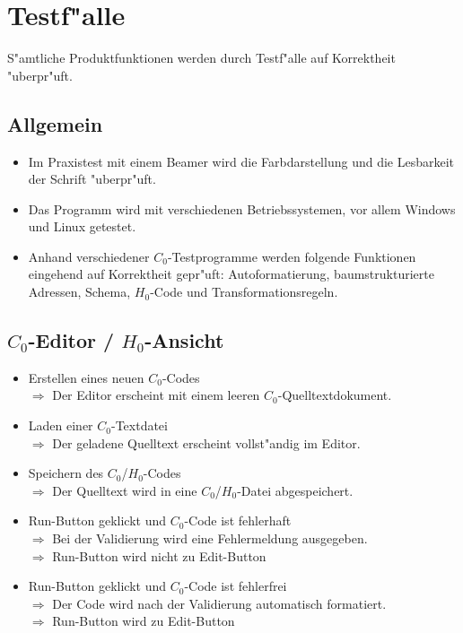 \section{Testf"alle}

S"amtliche Produktfunktionen werden durch Testf"alle auf Korrektheit "uberpr"uft.

	\subsection{Allgemein}
	\begin{itemize}
		\item Im Praxistest mit einem Beamer wird die Farbdarstellung und die Lesbarkeit der Schrift "uberpr"uft.
		\item Das Programm wird mit verschiedenen Betriebssystemen, vor allem Windows und Linux getestet.
		\item Anhand verschiedener $C_0$-Testprogramme werden folgende Funktionen eingehend auf Korrektheit gepr"uft: Autoformatierung, baumstrukturierte Adressen, Schema, $H_0$-Code und Transformationsregeln.
	\end{itemize}
	
	\subsection{$C_0$-Editor / $H_0$-Ansicht}
	\begin{itemize}
    \item Erstellen eines neuen $C_0$-Codes \\
    $\Rightarrow$ Der Editor erscheint mit einem leeren $C_0$-Quelltextdokument.
		\item Laden einer $C_0$-Textdatei \\
		$\Rightarrow$ Der geladene Quelltext erscheint vollst"andig im Editor.
		\item Speichern des $C_0$/$H_0$-Codes \\
		$\Rightarrow$ Der Quelltext wird in eine $C_0$/$H_0$-Datei abgespeichert.
		\item Run-Button geklickt und $C_0$-Code ist fehlerhaft \\
		$\Rightarrow$ Bei der Validierung wird eine Fehlermeldung ausgegeben. \\
		$\Rightarrow$ Run-Button wird nicht zu Edit-Button
		\item Run-Button geklickt und $C_0$-Code ist fehlerfrei \\
		$\Rightarrow$ Der Code wird nach der Validierung automatisch formatiert. \\
		$\Rightarrow$ Run-Button wird zu Edit-Button
	\end{itemize}

